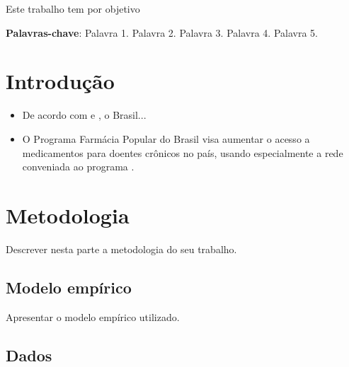

\newcommand\disciplina{Estatística}
\newcommand\professor{Aléssio Tony C. Almeida}






\begin{resumo}
Este trabalho tem por objetivo \lipsum[1-1]

\textbf{Palavras-chave}: Palavra 1. Palavra 2. Palavra 3. Palavra 4. Palavra 5.
\end{resumo}

\textual
{}

\chapter{Introdução}

\lipsum[1-1]


\begin{itemize}
    \item De acordo com  e , o Brasil...
    \item O Programa Farmácia Popular do Brasil visa aumentar o acesso a medicamentos para doentes crônicos no país, usando especialmente a rede conveniada ao programa \cite{Almeida2019}.
\end{itemize}

\lipsum[1-5]

\chapter{Metodologia}

Descrever nesta parte a metodologia do seu trabalho.

\section{Modelo empírico}

Apresentar o modelo empírico utilizado.

\section{Dados}

